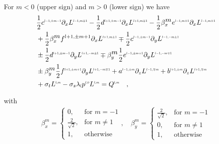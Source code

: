 \documentclass{egpubl}
\begin{document}
For $m<0$ (upper sign) and $m>0$ (lower sign) we have
\begin{align}
&
\frac{1}{2}c^{\scaleto{l-1,\pm m-1}{4pt}}\partial_x L^{\scaleto{l-1,m\mp 1}{4pt}}
-\frac{1}{2}d^{\scaleto{l+1,\pm m-1}{4pt}}\partial_x L^{\scaleto{l+1,m\mp 1}{4pt}}
-\frac{1}{2}\beta_x^{\scaleto{m}{4pt}}e^{\scaleto{l-1,m\pm 1}{4pt}}\partial_x L^{\scaleto{l-1,m\pm 1}{4pt}}
\nonumber
\\&
+\frac{1}{2}\beta_x^{\scaleto{m}{4pt}}f^{l+1,\pm m+1}\partial_x L^{\scaleto{l+1,m\pm 1}{4pt}}
\mp \frac{1}{2}c^{\scaleto{l-1,\pm m-1}{4pt}}\partial_y L^{\scaleto{l-1,-m\pm 1}{4pt}}
\nonumber
\\&
\pm \frac{1}{2}d^{\scaleto{l+1,\pm m-1}{4pt}}\partial_y L^{\scaleto{l+1,-m \pm 1}{4pt}}
\mp \beta_y^{\scaleto{m}{4pt}}\frac{1}{2}e^{\scaleto{l-1,\pm m+1}{4pt}}\partial_y L^{\scaleto{l-1,-m\mp 1}{4pt}}
\nonumber
\\&
\pm \beta_y^{\scaleto{m}{4pt}}\frac{1}{2}f^{\scaleto{l+1,\pm m+1}{4pt}}\partial_y L^{\scaleto{l+1,-m\mp 1}{4pt}}
+a^{\scaleto{l-1,\pm m}{4pt}}\partial_z L^{\scaleto{l-1,\mp m}{4pt}}
+b^{\scaleto{l+1,\pm m}{4pt}}\partial_z L^{\scaleto{l+1,\mp m}{4pt}}
\nonumber
\\&
+\sigma_t L^{\scaleto{l,m}{4pt}}
-\sigma_s\lambda_{\scaleto{l}{4pt}}p^{\scaleto{l,0}{4pt}}L^{\scaleto{l,m}{4pt}}
= Q^{\scaleto{l,m}{4pt}}
\quad ,
\label{eq:rpn_m_>_z}
\end{align}

with
\begin{align*}
\label{eq:real_sh_basis}
\beta_x^{m}=
\left\{
\begin{array}{ll}
0, & \text{for } m = -1\\
\frac{2}{\sqrt{2}}, & \text{for } m \neq 1\\
1, & \text{otherwise }
\end{array}
\right.
,\quad
\beta_y^{m}=
\left\{
\begin{array}{ll}
\frac{2}{\sqrt{2}}, & \text{for } m = -1\\
0, & \text{for } m \neq 1\\
1, & \text{otherwise }
\end{array}
\right.
\end{align*}
\end{document}
